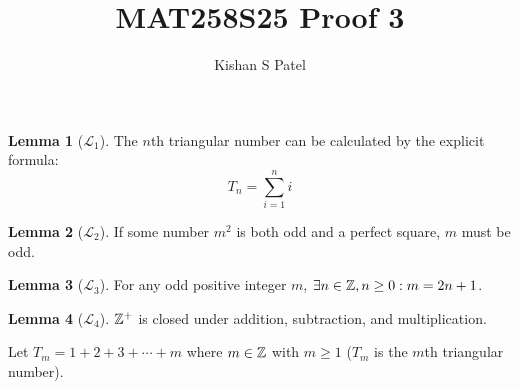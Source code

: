 \documentclass{exam}
\theoremstyle{plain}
\theoremstyle{definition}
\newtheorem{lemma}{Lemma}
\begin{document}
\title{MAT258S25 Proof 3}
\author{Kishan S Patel}
\maketitle

\renewcommand{\qedsymbol}{QED}


\begin{lemma}[$\mathcal L_1$]
	The $n$th triangular number can be calculated by the explicit formula:
	$$
		T_n = \sum_{i=1}^{n} i
	$$
\end{lemma}

\begin{lemma}[$\mathcal L_2$]
	If some number $m^2$ is both odd and a perfect square, $m$ must be odd.
\end{lemma}

\begin{lemma}[$\mathcal L_3$]
	For any odd positive integer $m$, $\exists n \in {\mathbb Z}, n\ge 0 : m=2n+1$.
\end{lemma}

\begin{lemma}[$\mathcal L_4$]
	${\mathbb Z}^{+}$ is closed under addition, subtraction, and multiplication.
\end{lemma}

Let $T_m=1+2+3+\cdots+m$ where $m \in {\mathbb Z}$  with $m \ge 1$ ($T_m$ is the $m$th triangular number).


\begin{questions}

	
	

\end{questions}
\end{document}
